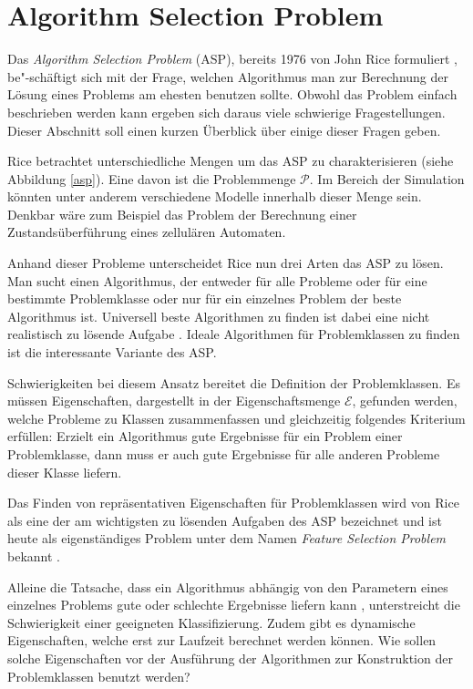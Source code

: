 \section{Algorithm Selection Problem}

Das \textit{Algorithm Selection Problem} (ASP), bereits 1976 von John Rice formuliert \cite{rice76}, be"-schäftigt sich mit der Frage, welchen Algorithmus man zur Berechnung der Lösung eines Problems am ehesten benutzen sollte. Obwohl das Problem einfach beschrieben werden kann ergeben sich daraus viele schwierige Fragestellungen. Dieser Abschnitt soll einen kurzen Überblick über einige dieser Fragen geben.

Rice betrachtet unterschiedliche Mengen um das ASP zu charakterisieren (siehe Abbildung \ref{asp}). Eine davon ist die Problemmenge $\mathcal{P}$. Im Bereich der Simulation könnten unter anderem verschiedene Modelle innerhalb dieser Menge sein. Denkbar wäre zum Beispiel das Problem der Berechnung einer Zustandsüberführung eines zellulären Automaten.

Anhand dieser Probleme unterscheidet Rice nun drei Arten das ASP zu lösen. Man sucht einen Algorithmus, der entweder für alle Probleme oder für eine bestimmte Problemklasse oder nur für ein einzelnes Problem der beste Algorithmus ist. Universell beste Algorithmen zu finden ist dabei eine nicht realistisch zu lösende Aufgabe \cite{smith09}. Ideale Algorithmen für Problemklassen zu finden ist die interessante Variante des ASP.

Schwierigkeiten bei diesem Ansatz bereitet die Definition der Problemklassen. Es müssen Eigenschaften, dargestellt in der Eigenschaftsmenge $\mathcal{E}$, gefunden werden, welche Probleme zu Klassen zusammenfassen und gleichzeitig folgendes Kriterium erfüllen: Erzielt ein Algorithmus gute Ergebnisse für ein Problem einer Problemklasse, dann muss er auch gute Ergebnisse für alle anderen Probleme dieser Klasse liefern. 

Das Finden von repräsentativen Eigenschaften für Problemklassen wird von Rice als eine der am wichtigsten zu lösenden Aufgaben des ASP bezeichnet und ist heute als eigenständiges Problem unter dem Namen \textit{Feature Selection Problem} bekannt \cite{kira92, guyon03}. 


Alleine die Tatsache, dass ein Algorithmus abhängig von den Parametern eines einzelnes Problems gute oder schlechte Ergebnisse liefern kann \cite{roberts06}, unterstreicht die Schwierigkeit einer geeigneten Klassifizierung. Zudem gibt es dynamische Eigenschaften, welche erst zur Laufzeit berechnet werden können. Wie sollen solche Eigenschaften vor der Ausführung der Algorithmen zur Konstruktion der Problemklassen benutzt werden? 

